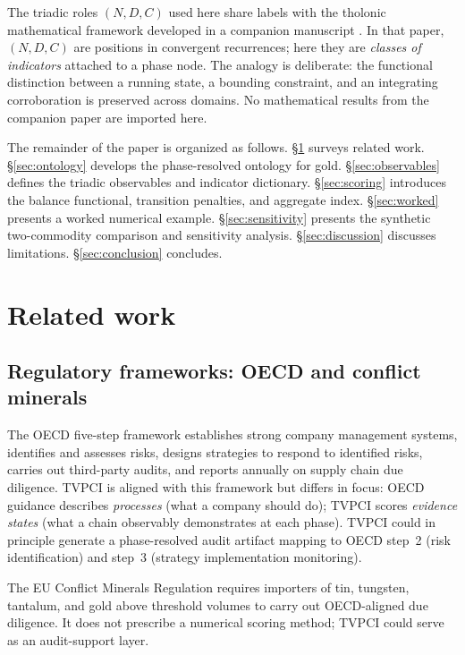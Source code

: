 \documentclass[12pt]{article}
\theoremstyle{remark}
\begin{document}
The triadic roles $(N, D, C)$ used here share labels with the tholonic mathematical
framework developed in a companion manuscript \cite{Milton2026comp}.  In that paper,
$(N, D, C)$ are positions in convergent recurrences; here they are \emph{classes of
indicators} attached to a phase node.  The analogy is deliberate: the functional
distinction between a running state, a bounding constraint, and an integrating
corroboration is preserved across domains.  No mathematical results from the companion
paper are imported here.

The remainder of the paper is organized as follows.  \S\ref{sec:related} surveys related
work.  \S\ref{sec:ontology} develops the phase-resolved ontology for gold.
\S\ref{sec:observables} defines the triadic observables and indicator dictionary.
\S\ref{sec:scoring} introduces the balance functional, transition penalties, and aggregate
index.  \S\ref{sec:worked} presents a worked numerical example.  \S\ref{sec:sensitivity}
presents the synthetic two-commodity comparison and sensitivity analysis.
\S\ref{sec:discussion} discusses limitations.  \S\ref{sec:conclusion} concludes.

\section{Related work}\label{sec:related}

\subsection{Regulatory frameworks: OECD and conflict minerals}

The OECD five-step framework \cite{OECD2016} establishes strong company management
systems, identifies and assesses risks, designs strategies to respond to identified risks,
carries out third-party audits, and reports annually on supply chain due diligence.
TVPCI is aligned with this framework but differs in focus: OECD guidance describes
\emph{processes} (what a company should do); TVPCI scores \emph{evidence states} (what a
chain observably demonstrates at each phase).  TVPCI could in principle generate a
phase-resolved audit artifact mapping to OECD step~2 (risk identification) and step~3
(strategy implementation monitoring).

The EU Conflict Minerals Regulation \cite{EU2017} requires importers of tin, tungsten,
tantalum, and gold above threshold volumes to carry out OECD-aligned due diligence.  It
does not prescribe a numerical scoring method; TVPCI could serve as an audit-support layer.
\end{document}
